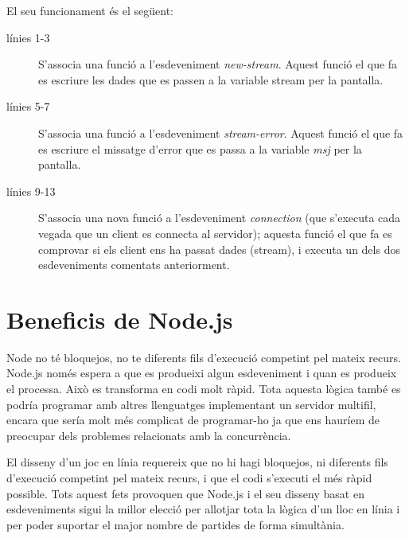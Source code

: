El seu funcionament és el següent: 

\begin{description}
    \item[línies 1-3] {S'associa una funció a l'esdeveniment \emph{new-stream}. Aquest funció el que fa es escriure les dades que es passen a la variable stream per la pantalla.}
    \item[línies 5-7] {S'associa una funció a l'esdeveniment \emph{stream-error}. Aquest funció el que fa es escriure el missatge d'error que es passa a la variable \emph{msj} per la pantalla.}
  \item[línies 9-13] {S'associa una nova funció a l'esdeveniment \emph{connection} (que s'executa cada vegada que un client es connecta al servidor); aquesta funció el que fa es comprovar si els client ens ha passat dades (stream), i executa un dels dos esdeveniments comentats anteriorment.}
\end{description}

\section{Beneficis de Node.js}

Node no té bloquejos, no te diferents fils d'execució competint pel mateix recurs. Node.js només espera a que es produeixi algun esdeveniment i quan es produeix el processa. Això es transforma en codi molt ràpid. Tota aquesta lògica també es podría programar amb altres llenguatges implementant un servidor multifil, encara que sería molt més complicat de programar-ho ja que ens hauríem de preocupar dels problemes relacionats amb la concurrència. 

El disseny d'un joc en línia requereix que no hi hagi bloquejos, ni diferents fils d'execució competint pel mateix recurs, i que el codi s'executi el més ràpid possible. Tots aquest fets provoquen que Node.js i el seu disseny basat en esdeveniments sigui la millor elecció per allotjar tota la lògica d'un lloc en línia i per poder suportar el major nombre de partides de forma simultània.



